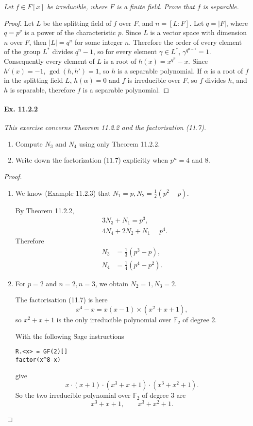 \documentclass[11pt,a4paper]{article}
\newcommand{\be} {\begin{enumerate}}
\newcommand{\ee} {\end{enumerate}}
\newcommand{\F}{\mathbb{F}}
\begin{document}
{\it Let $f \in F[x]$ be irreducible, where $F$ is a finite field. Prove that $f$ is separable.
}

\begin{proof} Let $L$ be the splitting field of $f$ over $F$, and $n =[L:F]$. Let $q = |F|$, where $q=p^\nu$ is a power of the characteristic $p$. Since $L$ is a vector space with dimension $n$ over $F$, then $|L|= q^n$ for some integer $n$. Therefore the order of every element of the group $L^*$ divides $q^n-1$, so for every element $\gamma \in L^*$, $\gamma^{q^{n-1}} = 1$. Consequently every element of $L$ is a root of $h(x) = x^{q^n}-x$. Since $h' (x)= -1$, $\gcd(h,h') = 1$, so $h$ is a separable polynomial. If $\alpha$ is a root of $f$ in the splitting field $L$, $h(\alpha) = 0$ and $f$ is irreducible over $F$, so $f$ divides $h$, and $h$ is separable, therefore $f$ is a separable polynomial.

\end{proof}

\paragraph{Ex. 11.2.2}

{\it This exercise concerns Theorem 11.2.2 and the factorisation (11.7).
\be 
\item[(a)]
Compute $N_3$ and $N_4$ using only Theorem 11.2.2.

\item[(b)]
Write down the factorization (11.7) explicitly when $p^n = 4$ and $8$.
\ee
}

\begin{proof}
\be
\item[(a)] We know (Example 11.2.3) that $N_1 = p, N_2 = \frac{1}{2}(p^2-p)$. 

By Theorem 11.2.2, 
\begin{align*}
&3N_3 + N_1 = p^3,\\
&4 N_4+2N_2+N_1 = p^4.
\end{align*}
Therefore
\begin{align*}
N_3 &= \frac{1}{3}(p^3-p),\\
N_4 &= \frac{1}{4}(p^4-p^2).
\end{align*}

\item[(b)] For $p=2$ and $n=2, n=3$, we obtain $N_2 = 1, N_3 = 2$.

The factorisation (11.7) is here
$$x^4 - x =  x(x-1) \times (x^2+x+1),$$
so $x^2+x+1$ is the only irreducible polynomial over $\F_2$ of degree 2.

With the following Sage instructions
\begin{verbatim}
R.<x> = GF(2)[]
factor(x^8-x)
\end{verbatim}
give 
$$x \cdot (x + 1) \cdot (x^{3} + x + 1) \cdot (x^{3} + x^{2} + 1).
$$
So the two irreducible polynomial over $\F_2$ of degree 3 are
$$x^{3} + x + 1, \qquad x^{3} + x^{2} + 1.$$
\ee
\end{proof}
\end{document}
